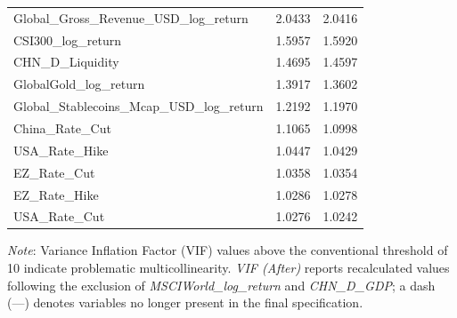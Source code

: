 \begin{tabular}{lcc}
  Global\_Gross\_Revenue\_USD\_log\_return & 2.0433 & 2.0416 \\ 
  CSI300\_log\_return & 1.5957 & 1.5920 \\ 
  CHN\_D\_Liquidity & 1.4695 & 1.4597 \\ 
  GlobalGold\_log\_return & 1.3917 & 1.3602 \\ 
  Global\_Stablecoins\_Mcap\_USD\_log\_return & 1.2192 & 1.1970 \\ 
  China\_Rate\_Cut & 1.1065 & 1.0998 \\ 
  USA\_Rate\_Hike & 1.0447 & 1.0429 \\ 
  EZ\_Rate\_Cut & 1.0358 & 1.0354 \\ 
  EZ\_Rate\_Hike & 1.0286 & 1.0278 \\ 
  USA\_Rate\_Cut & 1.0276 & 1.0242 \\ 
  \bottomrule
\end{tabular}
\par\vspace{4pt}
\begin{minipage}{\linewidth}
  \footnotesize \textit{Note}: Variance Inflation Factor (VIF) values above the conventional threshold of 10 indicate problematic multicollinearity. \textit{VIF (After)} reports recalculated values following the exclusion of \textit{MSCIWorld\_log\_return} and \textit{CHN\_D\_GDP}; a dash (---) denotes variables no longer present in the final specification.
\end{minipage}